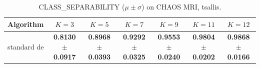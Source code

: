 \begin{table}[htbp]
\centering
\caption{CLASS_SEPARABILITY ($\mu \pm \sigma$) on CHAOS MRI, tsallis.}
\label{tab:exp2-tsallis-class_separability}
\begin{tabular}{lcccccc}
\toprule
Algorithm & $K=3$ & $K=5$ & $K=7$ & $K=9$ & $K=11$ & $K=12$ \\
\midrule
standard de & \textbf{0.8130 $\pm$ 0.0917} & \textbf{0.8968 $\pm$ 0.0393} & \textbf{0.9292 $\pm$ 0.0325} & \textbf{0.9553 $\pm$ 0.0240} & \textbf{0.9804 $\pm$ 0.0202} & \textbf{0.9868 $\pm$ 0.0166} \\
\bottomrule
\end{tabular}
\end{table}